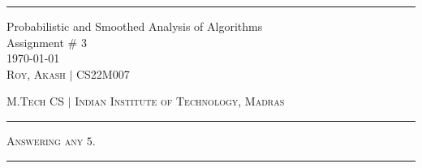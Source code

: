 \documentclass[12pt, a4paper, onecolumn]{exam}
\begin{document}
\hrule
\vspace{1em}

\begingroup
	\centering
	\LARGE Probabilistic and Smoothed Analysis of Algorithms\\
	\LARGE Assignment \# 3\\[0.5em]
	\large \today\\[0.5em]
	\large \textsc{Roy, Akash} $\mid$ CS22M007\par
	\large \textsc{M.Tech CS} $\mid$ \textsc{Indian Institute of Technology, Madras}\par
\endgroup
\pointsdroppedatright %
\printanswers
\renewcommand{\solutiontitle}{\noindent\textbf{Ans:}\enspace}   %

\vspace{1em}
\hrule
\vspace{0.2em}

\begin{center}
	\textsc{Answering any} $5$.
\end{center}

\vspace{0.2em}
\hrule
\vspace{1em}
\end{document}
